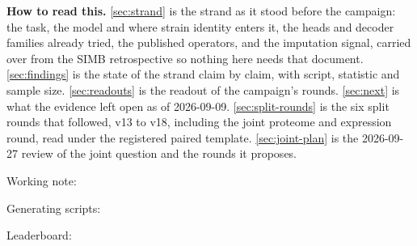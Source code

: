 \documentclass[10pt,a4paper]{article}
\begin{document}
\vspace{0.5em}
{\small\color{tcgray}
\textbf{How to read this.} \cref{sec:strand} is the strand as it stood before the
campaign: the task, the model and where strain identity enters it, the heads and decoder
families already tried, the published operators, and the imputation signal, carried over
from the SIMB retrospective so nothing here needs that document. \cref{sec:findings} is
the state of the strand claim by claim, with script, statistic and sample size.
\cref{sec:readouts} is the readout of the campaign's rounds. \cref{sec:next} is what the
evidence left open as of 2026-09-09. \cref{sec:split-rounds} is the six split rounds that
followed, v13 to v18, including the joint proteome and expression round, read under the
registered paired template. \cref{sec:joint-plan} is the 2026-09-27 review of the joint
question and the rounds it proposes.\par\smallskip

Working note: \par
Generating scripts: \par
Leaderboard: \par}

\vspace{1em}
\tccontents

\clearpage








\end{document}
